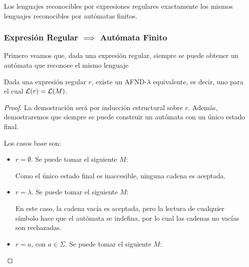 Los lenguajes reconocibles por expresiones regulares exactamente los mismos lenguajes reconocibles por autómatas finitos.

\subsubsection{Expresión Regular $\implies$ Autómata Finito}

Primero veamos que, dada una expresión regular, siempre se puede obtener un autómata que reconoce el mismo lenguaje

\begin{theorem*}
    Dada una expresión regular $r$, existe un AFND-$\lambda$ equivalente, es decir, uno para el cual $\mathcal{L}(r) = \mathcal{L}(M)$.
\end{theorem*}
\begin{proof}
    La demostración será por inducción estructural sobre $r$. Además, demostraremos que siempre se puede construir un autómata con un único estado final.

    Los casos base son:
    \begin{itemize}
        \item $r = \emptyset$. Se puede tomar el siguiente $M$:
              \begin{figure}[H]
                  \centering
              \end{figure}

              Como el único estado final es inaccesible, ninguna cadena es aceptada.
        \item $r = \lambda$. Se puede tomar el siguiente $M$:
              \begin{figure}[H]
                  \centering
              \end{figure}

              En este caso, la cadena vacía es aceptada, pero la lectura de cualquier símbolo hace que el autómata se indefina, por lo cual las cadenas no vacías son rechazadas.
        \item $r = a$, con $a \in \Sigma$. Se puede tomar el siguiente $M$:
              \begin{figure}[H]
                  \centering
\end{figure}
\end{itemize}
\end{proof}
